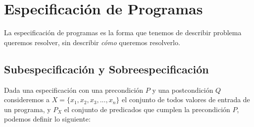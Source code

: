 \documentclass[../main.tex]{subfiles}
\begin{document}
\section{Especificación de Programas}

La especificación de programas es la forma que tenemos de describir  problema queremos resolver, sin describir \textit{cómo} queremos
resolverlo.

\subsection{Subespecificación y Sobreespecificación}

Dada una especificación con una precondición $P$ y una postcondición $Q$ consideremos a $X = \{ x_1, x_2, x_3, ..., x_n\}$ el conjunto de todos valores de entrada de un programa, y $P_X$ el conjunto de predicados que
cumplen la precondición $P$, podemos definir lo siguiente:
\end{document}
